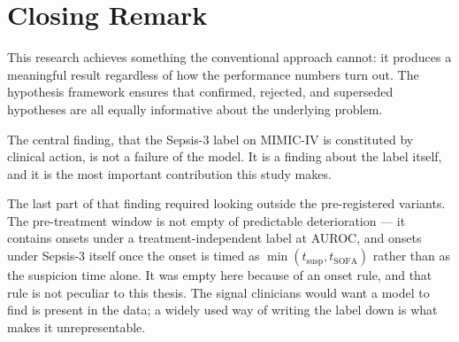 \section{Closing Remark}

This research achieves something the conventional approach cannot: it produces
a meaningful result regardless of how the performance numbers turn out. The
hypothesis framework ensures that confirmed, rejected, and superseded
hypotheses are all equally informative about the underlying problem.

The central finding, that the Sepsis-3 label on MIMIC-IV is constituted by
clinical action, is not a failure of the model. It is a finding about the label
itself, and it is the most important contribution this study makes.

The last part of that finding required looking outside the pre-registered
variants. The pre-treatment window is not empty of predictable deterioration ---
it contains \pcPreTreatOnsetsVarD{} onsets under a treatment-independent label
at \pcPreTreatAurocPrimaryD{} AUROC, and \pcPreTreatOnsetsVarF{} onsets under
Sepsis-3 itself once the onset is timed as
$\min(t_{\text{susp}}, t_{\text{SOFA}})$ rather than as the suspicion time
alone. It was empty here because of an onset rule, and that rule is not
peculiar to this thesis. The signal clinicians would want a model to find is
present in the data; a widely used way of writing the label down is what makes
it unrepresentable.
